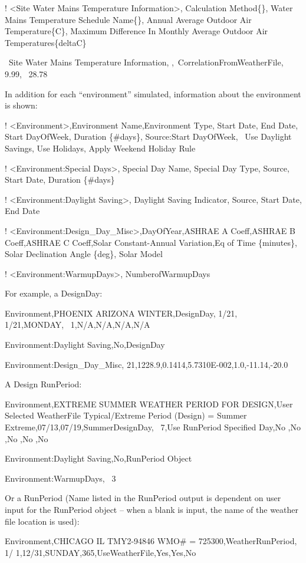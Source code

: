 ! \textless{}Site Water Mains Temperature Information\textgreater{}, Calculation Method\{\}, Water Mains Temperature Schedule Name\{\}, Annual Average Outdoor Air Temperature\{C\}, Maximum Difference In Monthly Average Outdoor Air Temperatures\{deltaC\}

~Site Water Mains Temperature Information, ,~CorrelationFromWeatherFile,~ 9.99,~ 28.78

In addition for each ``environment'' simulated, information about the environment is shown:

! \textless{}Environment\textgreater{},Environment Name,Environment Type, Start Date, End Date, Start DayOfWeek, Duration \{\#days\}, Source:Start DayOfWeek,~ Use Daylight Savings, Use Holidays, Apply Weekend Holiday Rule

! \textless{}Environment:Special Days\textgreater{}, Special Day Name, Special Day Type, Source, Start Date, Duration \{\#days\}

! \textless{}Environment:Daylight Saving\textgreater{}, Daylight Saving Indicator, Source, Start Date, End Date

! \textless{}Environment:Design\_Day\_Misc\textgreater{},DayOfYear,ASHRAE A Coeff,ASHRAE B Coeff,ASHRAE C Coeff,Solar Constant-Annual Variation,Eq of Time \{minutes\}, Solar Declination Angle \{deg\}, Solar Model

! \textless{}Environment:WarmupDays\textgreater{}, NumberofWarmupDays

For example, a DesignDay:

Environment,PHOENIX ARIZONA WINTER,DesignDay, 1/21, 1/21,MONDAY,~ 1,N/A,N/A,N/A,N/A

Environment:Daylight Saving,No,DesignDay

Environment:Design\_Day\_Misc, 21,1228.9,0.1414,5.7310E-002,1.0,-11.14,-20.0

A Design RunPeriod:

Environment,EXTREME SUMMER WEATHER PERIOD FOR DESIGN,User Selected WeatherFile Typical/Extreme Period (Design) = Summer Extreme,07/13,07/19,SummerDesignDay,~ 7,Use RunPeriod Specified Day,No ,No ,No ,No ,No

Environment:Daylight Saving,No,RunPeriod Object

Environment:WarmupDays,~ 3

Or a RunPeriod (Name listed in the RunPeriod output is dependent on user input for the RunPeriod object -- when a blank is input, the name of the weather file location is used):

Environment,CHICAGO IL TMY2-94846 WMO\# = 725300,WeatherRunPeriod, 1/ 1,12/31,SUNDAY,365,UseWeatherFile,Yes,Yes,No

